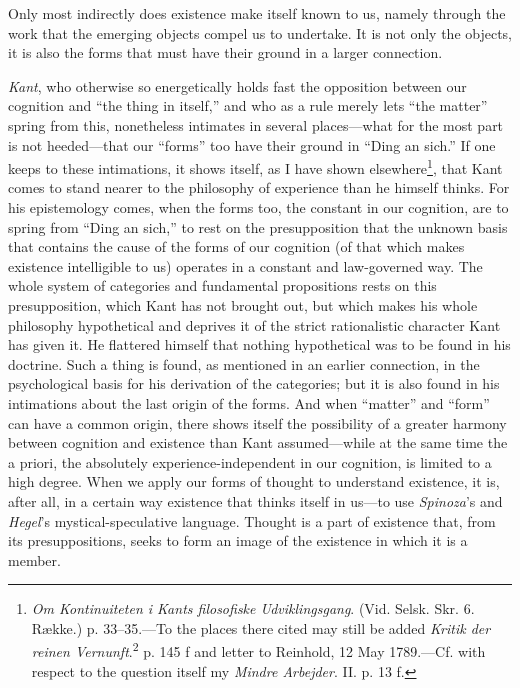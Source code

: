 \documentclass[12pt,a4paper]{book}
\newcommand{\opage}[1]{\marginnote{\footnotesize\textit{[#1]}}}
\begin{document}
Only most indirectly does existence make itself known to us, namely through
the work that the emerging objects compel us to undertake. It is not only the
objects, it is also the forms that must have their ground in a larger
connection.

\emph{Kant}, who otherwise so energetically holds fast the opposition between
our cognition and ``the thing in itself,'' and who as a rule merely lets ``the
matter'' spring from this, \opage{263}nonetheless intimates in several places---what for
the most part is not heeded---that our ``forms'' too have their ground in
``Ding an sich.'' If one keeps to these intimations, it shows itself, as I have
shown elsewhere\footnote{\emph{Om Kontinuiteten i Kants filosofiske
Udviklingsgang}. (Vid. Selsk. Skr. 6. Række.) p. 33--35.---To the places there
cited may still be added \emph{Kritik der reinen Vernunft}.\textsuperscript{2}
p. 145 f and letter to Reinhold, 12 May 1789.---Cf. with respect to the
question itself my \emph{Mindre Arbejder}. II. p. 13 f.}, that Kant comes to
stand nearer to the philosophy of experience than he himself thinks. For his
epistemology comes, when the forms too, the constant in our cognition, are to
spring from ``Ding an sich,'' to rest on the presupposition that the unknown
basis that contains the cause of the forms of our cognition (of that which
makes existence intelligible to us) operates in a constant and law-governed
way. The whole system of categories and fundamental propositions rests on this
presupposition, which Kant has not brought out, but which makes his whole
philosophy hypothetical and deprives it of the strict rationalistic character
Kant has given it. He flattered himself that nothing hypothetical was to be
found in his doctrine. Such a thing is found, as mentioned in an earlier
connection, in the psychological basis for his derivation of the categories;
but it is also found in his intimations about the last origin of the forms.
And when ``matter'' and ``form'' can have a common origin, there shows itself
the possibility of a greater harmony between cognition and existence than Kant
assumed---while at the same time the a priori, the absolutely
experience-independent in our cognition, is limited to a high degree. When we
apply our forms of thought to understand existence, it is, after all, in a
certain way existence that thinks itself in us---to use \emph{Spinoza}'s and
\emph{Hegel}'s mystical-speculative language. Thought is a part of existence
that, from its presuppositions, seeks to form an image of the existence in
which it is a member.
\end{document}
